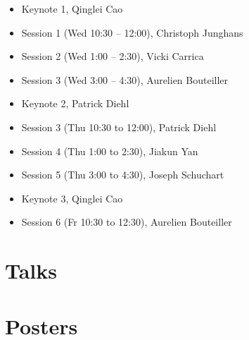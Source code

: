 \documentclass[12pt,letterpaper]{book}
\newenvironment{conf-abstract}[4][]{
 \needspace{10\baselineskip}
 \begin{center}
 { \renewcommand\textsuperscript[1]{}
 \phantomsection\addcontentsline{toc}{section}
 {\texorpdfstring{#2 (\emph{#3})}{#2 (#3)}}
 }
 {{\large\bfseries #2}\marginnote{#1}\par}
 \medskip
 {#3\par}
 \smallskip
 {\small #4\par}
 \end{center}
}{%
 \bigskip
 \hrule
 \bigskip
}
\newcommand{\indexauthors}[1]{%
 \forcsvlist{\index}{#1}
}
\begin{document}
\begin{itemize}
\item Keynote 1, Qinglei Cao 
\item Session 1 (Wed 10:30 -- 12:00), Christoph Junghans 
\item Session 2 (Wed 1:00 -- 2:30), Vicki Carrica
\item Session 3 (Wed 3:00 -- 4:30), Aurelien Bouteiller
\item Keynote 2, Patrick Diehl
\item Session 3 (Thu 10:30 to 12:00), Patrick Diehl
\item Session 4 (Thu 1:00 to 2:30), Jiakun Yan
\item Session 5 (Thu 3:00 to 4:30), Joseph Schuchart 
\item Keynote 3, Qinglei Cao
\item Session 6 (Fr 10:30 to 12:30), Aurelien Bouteiller
\end{itemize}

\chapter{Talks}

{
\begin{conf-abstract}[\datum\\\tiny\time]
{\title}
{\first~ \last}
{\affiliation}
\indexauthors{\last~\first}

\newpage
\end{conf-abstract}
}

\chapter{Posters}

{
\def\x{\last}
\def\y{\substring{\x}{1}{1}\par}
\begin{conf-abstract}[\datum\\\time]
{\title}
{\first~\last}
{\affiliation}
\indexauthors{\last~\first}
\begin{center}

\end{center}
\end{conf-abstract}
}


%
\end{document}
